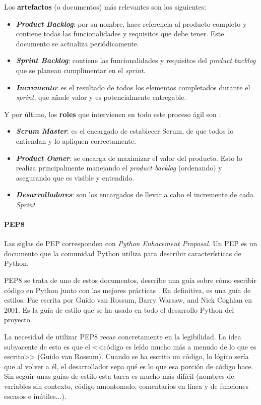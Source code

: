 Los \textbf{artefactos} (o documentos) más relevantes son los siguientes:
\begin{itemize}
	\item \textbf{\textit{Product Backlog}}: por su nombre, hace referencia al
	producto completo y contiene todas las funcionalidades y requisitos que debe
	tener. Este documento se actualiza periódicamente.
	\item \textbf{\textit{Sprint Backlog}}: contiene las funcionalidades y
	requisitos del \textit{product backlog} que se planean cumplimentar en el
	\emph{sprint}.
	\item \textbf{\textit{Incremento}}: es el resultado de todos los elementos
	completados durante el \emph{sprint}, que añade valor y es potencialmente
	entregable.
\end{itemize}

Y por último, los \textbf{roles} que intervienen en todo este proceso ágil son
\cite{scrum:team}:
\begin{itemize}
	\item \textbf{\textit{Scrum Master}}: es el encargado de establecer Scrum,
	de que todos lo entiendan y lo apliquen correctamente.
	\item \textbf{\textit{Product Owner}}: se encarga de maximizar el valor del
	producto. Esto lo realiza principalmente manejando el \textit{product
	backlog} (ordenando) y asegurando que es visible y entendido.
	\item \textbf{\textit{Desarrolladores}}: son los encargados de llevar a cabo
	el incremente de cada \textit{Sprint}.
\end{itemize}


\paragraph{PEP8} Las siglas de PEP corresponden con \textit{Python Enhacement
Proposal}. Un PEP es un documento que la comunidad Python utiliza para describir
características de Python.

PEP8 se trata de uno de estos documentos, describe una guía sobre cómo escribir
código en Python junto con las mejores prácticas \cite{pep8:desc}. En
definitiva, es una guía de estilos. Fue escrita por Guido van Rossum, Barry
Warsaw, and Nick Coghlan en 2001. Es la guía de estilo que se ha usado en todo
el desarrollo Python del proyecto.

La necesidad de utilizar PEP8 recae concretamente en la legibilidad. La idea
subyacente de esto es que el <<código es leído mucho más a menudo de lo que es
escrito>> (Guido van Rossum). Cuando se ha escrito un código, lo lógico sería
que al volver a él, el desarrollador sepa qué es lo que esa porción de código
hace. Sin seguir unas guías de estilo esta tarea es mucho más difícil (nombres
de variables sin contexto, código amontonado, comentarios en línea y de
funciones escasos e inútiles...).

